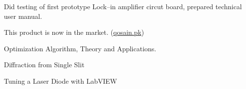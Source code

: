 
\smallskip
\begin{addtab}
\end{addtab}
\begin{tabitemize}

\item {}


\begin{tabitemize}
    \item Did testing of first prototype Lock--in amplifier circut board, prepared technical user manual.
    \item This product is now in the market. (\textcolor{blue}{\hyperlink{https://www.qosain.pk/physics/general-purpose/entry-level-lockin-amplifier-board-2}{qosain.pk}})
\end{tabitemize}
\end{tabitemize}

 \begin{addtab}
 \end{addtab}
\begin{tabitemize}
    \begin{multicols}{3}
    \item  {Optimization Algorithm, Theory and Applications.}
    \item  {Diffraction from Single Slit}
    \item  {Tuning a Laser Diode with LabVIEW}
    \end{multicols}
\end{tabitemize}
